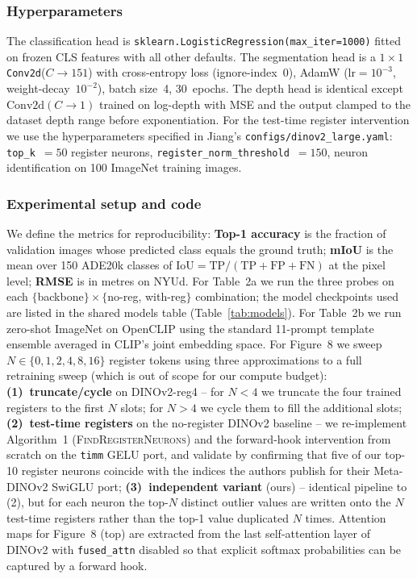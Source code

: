 \subsubsection{Hyperparameters}
The classification head is \texttt{sklearn.LogisticRegression(max\_iter=1000)} fitted on frozen CLS features with all other defaults. The segmentation head is a $1\!\times\!1$ \texttt{Conv2d}($C \to 151$) with cross-entropy loss (ignore-index~0), AdamW ($\text{lr}=10^{-3}$, weight-decay~$10^{-2}$), batch size~4, 30~epochs. The depth head is identical except $\text{Conv2d}(C \to 1)$ trained on log-depth with MSE and the output clamped to the dataset depth range before exponentiation. For the test-time register intervention we use the hyperparameters specified in Jiang's \texttt{configs/dinov2\_large.yaml}: \texttt{top\_k}~$=50$ register neurons, \texttt{register\_norm\_threshold}~$=150$, neuron identification on 100 ImageNet training images.

\subsubsection{Experimental setup and code}
We define the metrics for reproducibility: \textbf{Top-1 accuracy} is the fraction of validation images whose predicted class equals the ground truth; \textbf{mIoU} is the mean over 150 ADE20k classes of $\mathrm{IoU} = \mathrm{TP}/(\mathrm{TP}+\mathrm{FP}+\mathrm{FN})$ at the pixel level; \textbf{RMSE} is in metres on NYUd. For Table~2a we run the three probes on each $\{$backbone$\}\times\{$no-reg, with-reg$\}$ combination; the model checkpoints used are listed in the shared models table (Table~\ref{tab:models}). For Table~2b we run zero-shot ImageNet on OpenCLIP using the standard 11-prompt template ensemble averaged in CLIP's joint embedding space. For Figure~8 we sweep $N \in \{0,1,2,4,8,16\}$ register tokens using three approximations to a full retraining sweep (which is out of scope for our compute budget): \textbf{(1)~truncate/cycle} on DINOv2-reg4 -- for $N<4$ we truncate the four trained registers to the first $N$ slots; for $N>4$ we cycle them to fill the additional slots; \textbf{(2)~test-time registers} \citep{jiang2025vision} on the no-register DINOv2 baseline -- we re-implement Algorithm~1 (\textsc{FindRegisterNeurons}) and the forward-hook intervention from scratch on the \texttt{timm} GELU port, and validate by confirming that five of our top-10 register neurons coincide with the indices the authors publish for their Meta-DINOv2 SwiGLU port; \textbf{(3)~independent variant} (ours) -- identical pipeline to (2), but for each neuron the top-$N$ distinct outlier values are written onto the $N$ test-time registers rather than the top-1 value duplicated $N$ times. Attention maps for Figure~8 (top) are extracted from the last self-attention layer of DINOv2 with \texttt{fused\_attn} disabled so that explicit softmax probabilities can be captured by a forward hook.

